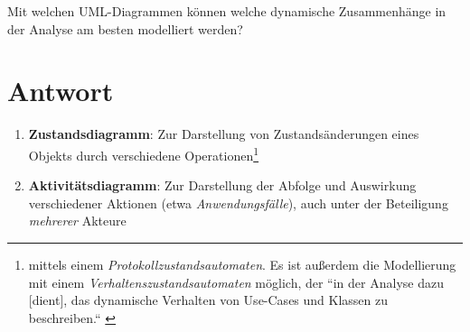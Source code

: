 Mit welchen UML-Diagrammen können welche dynamische Zusammenhänge in der Analyse am besten modelliert werden?


\section*{Antwort}

\begin{enumerate}
    \item \textbf{Zustandsdiagramm}: Zur Darstellung von Zustandsänderungen eines Objekts durch verschiedene Operationen\footnote{
    mittels einem \textit{Protokollzustandsautomaten}.
    Es ist außerdem die Modellierung mit einem \textit{Verhaltenszustandsautomaten} möglich, der  ``in der Analyse dazu [dient], das dynamische Verhalten von Use-Cases und Klassen zu beschreiben.`` \cite[548]{Bal05}
    }
    \item \textbf{Aktivitätsdiagramm}: Zur Darstellung der Abfolge und Auswirkung verschiedener Aktionen (etwa \textit{Anwendungsfälle}), auch unter der Beteiligung \textit{mehrerer} Akteure

\end{enumerate}